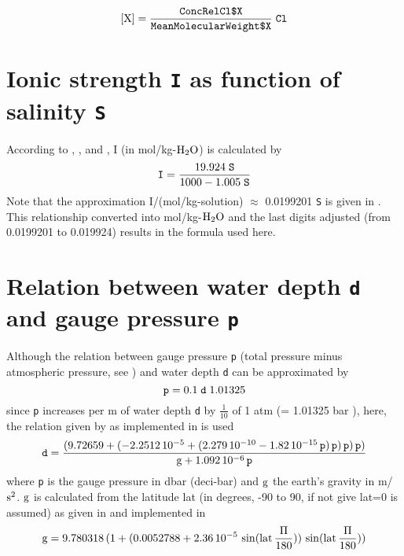 \documentclass[a4paper]{article}
\begin{document}
\begin{equation}
\rm [X] = \frac{\mbox{\texttt{ConcRelCl\textdollar$ $X}}}{\mbox{\texttt{MeanMolecularWeight\textdollar$ $X}}}\;\texttt{Cl}
\end{equation}

\section{Ionic strength \texttt{I} as function of salinity \texttt{S}}
According to \citet[chapter 5, p. 13, 15]{DOE1994},  \citet[ p.12]{Zeebe2001}, and \citet[ p.257]{Roy1993b}, I (in mol/kg-$\rm H_2O$) is calculated by
\begin{equation}
\rm \mbox{\texttt{I}} = \frac{19.924\;\mbox{\texttt{S}}}{1000-1.005\;\mbox{\texttt{S}}}
\end{equation}
Note that the approximation I/(mol/kg-solution) $\approx$ 0.0199201 \texttt{S} is given in \citet[  p. 428.]{Millero1982}.
This relationship converted into mol/kg-$\rm H_2O$ and the last digits adjusted (from 0.0199201 to 0.019924) results in the formula used here.\\

\section{Relation between water depth \texttt{d} and gauge pressure \texttt{p}}
Although the relation between gauge pressure \texttt{p} (total pressure minus atmospheric pressure, see \cite{Feistel2008})  and water depth \texttt{d} can be approximated by 
\begin{equation}
 \rm \mbox{\texttt{p}} = 0.1\;\mbox{\texttt{d}}\;1.01325
\end{equation}
since \texttt{p} increases per m of water depth \texttt{d} by $\frac{1}{10}$ of 1 atm (= 1.01325 bar \citet[chap. 5, p. 3]{Dickson2007}),
here, the relation given by \cite{Fofonoff1983} as implemented in \cite{marelac} is used
\begin{equation}
\rm \mbox{\texttt{d}} = \frac{(9.72659 + (-2.2512\,10^{-5} + (2.279\,10^{-10} - 1.82\,10^{-15} \, \mbox{\texttt{p}}) \, \mbox{\texttt{p}})\, \mbox{\texttt{p}})\, \mbox{\texttt{p}})}{g + 1.092\,10^{-6} \, \mbox{\texttt{p}}}
\end{equation}
where \mbox{\texttt{p}} is the gauge pressure in dbar (deci-bar) and $\rm g$ the earth's gravity in m/$\rm s^2$. $\rm g$ is calculated from the latitude lat (in degrees, -90 to 90, if not give lat=0 is assumed) as given in \cite{Fofonoff1983}
and implemented in \cite{marelac}
\begin{equation}
\rm g = 9.780318\, (1+ ( 0.0052788 + 2.36\,10^{-5}\,\sin(lat\,\frac{\Pi}{180}))\,\sin(lat\,\frac{\Pi}{180}))
\end{equation}
\end{document}

